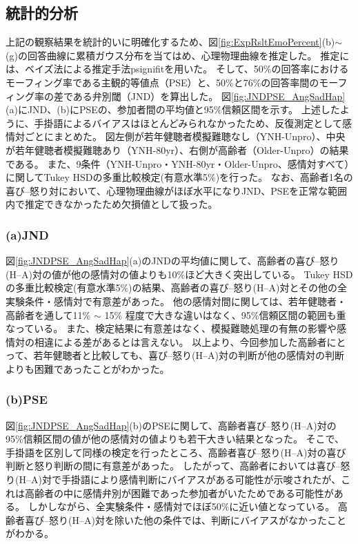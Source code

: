 \subsection{統計的分析}
\label{sec:Statistics}
上記の観察結果を統計的いに明確化するため、図\ref{fig:ExpRsltEmoPercent}(b)$\sim$(g)の回答曲線に累積ガウス分布を当てはめ、心理物理曲線を推定した。
推定には、ベイズ法による推定手法psignifit\cite{schutt2016painfree}を用いた。
そして、50\%の回答率におけるモーフィング率である主観的等値点（PSE）と、50\%と76\%の回答率間のモーフィング率の差である弁別閾（JND）を算出した。 
図\ref{fig:JNDPSE_AngSadHap}(a)にJND、(b)にPSEの、参加者間の平均値と95\%信頼区間を示す。
上述したように、手掛語によるバイアスはほとんどみられなかったため、反復測定として感情対ごとにまとめた。
図左側が若年健聴者模擬難聴なし（YNH-Unpro）、中央が若年健聴者模擬難聴あり（YNH-80yr）、右側が高齢者（Older-Unpro）の結果である。
また、9条件（YNH-Unpro・YNH-80yr・Older-Unpro、感情対すべて）に関してTukey HSDの多重比較検定(有意水準5\%)を行った。
なお、高齢者1名の喜び--怒り対において、心理物理曲線がほぼ水平になりJND、PSEを正常な範囲内で推定できなかったため欠損値として扱った。

\subsubsection{(a)JND}
図\ref{fig:JNDPSE_AngSadHap}(a)のJNDの平均値に関して、高齢者の喜び--怒り(H--A)対の値が他の感情対の値よりも10\%ほど大きく突出している。
Tukey HSDの多重比較検定(有意水準5\%)の結果、高齢者の喜び--怒り(H--A)対とその他の全実験条件・感情対で有意差があった。
他の感情対間に関しては、若年健聴者・高齢者を通して11\% $\sim$ 15\% 程度で大きな違いはなく、95\%信頼区間の範囲も重なっている。 
また、検定結果に有意差はなく、模擬難聴処理の有無の影響や感情対の相違による差があるとは言えない。
以上より、今回参加した高齢者にとって、若年健聴者と比較しても、喜び--怒り(H--A)対の判断が他の感情対の判断よりも困難であったことがわかった。

\subsubsection{(b)PSE}
図\ref{fig:JNDPSE_AngSadHap}(b)のPSEに関して、高齢者喜び--怒り(H--A)対の95\%信頼区間の値が他の感情対の値よりも若干大きい結果となった。
そこで、手掛語を区別して同様の検定を行ったところ、高齢者喜び--怒り(H--A)対の喜び判断と怒り判断の間に有意差があった。
したがって、高齢者においては喜び--怒り(H--A)対で手掛語により感情判断にバイアスがある可能性が示唆されたが、これは高齢者の中に感情弁別が困難であった参加者がいたためである可能性がある。
しかしながら、全実験条件・感情対でほぼ50\%に近い値となっている。
高齢者喜び--怒り(H--A)対を除いた他の条件では、判断にバイアスがなかったことがわかる。

